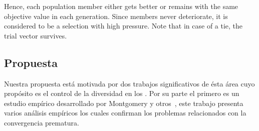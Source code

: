 Hence, each population member either gets better or remains with the same objective value in each generation.
%
Since members never deteriorate, it is considered to be a selection with high pressure.
%
Note that in case of a tie, the trial vector survives.

%


\subsection{Propuesta}

Nuestra propuesta está motivada por dos trabajos significativos de ésta área cuyo propósito es el control de la diversidad en los \EAS{}.
%
Por su parte el primero es un estudio empírico desarrollado por Montgomery y otros~\cite{montgomery2012simple}, este trabajo presenta varios análisis empíricos los cuales confirman los problemas relacionados con la convergencia prematura.


